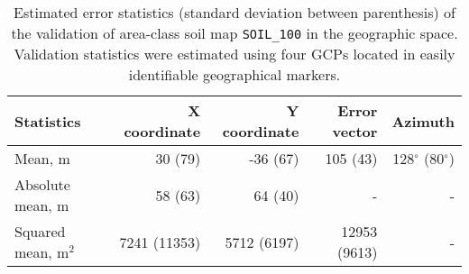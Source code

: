 \begin{table}[ht]
 \caption{Estimated error statistics (standard deviation between parenthesis) of the validation of
 area-class soil map \texttt{SOIL\_100} in the geographic space. Validation statistics were 
 estimated using four GCPs located in easily identifiable geographical markers.}
 \label{tab:covar-data-soil-geo-val}
 \centering
 {\small
 \begin{tabular}{lrrrr}
  \hline
  Statistics           & X coordinate & Y coordinate & Error vector & Azimuth                  \\
  \hline
  Mean, m              & 30   (79)    & -36  (67)    & 105   (43)   & 128$^\circ$ (80$^\circ$) \\ 
  Absolute mean, m     & 58   (63)    & 64   (40)    & -            & -                        \\ 
  Squared mean, m$^2$  & 7241 (11353) & 5712 (6197)  & 12953 (9613) & -                        \\ 
  \hline
 \end{tabular}}
\end{table}


